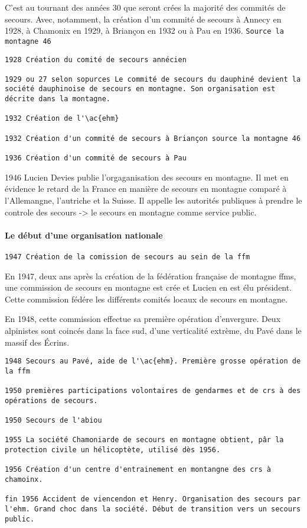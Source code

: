 C'est au tournant des années 30 que seront crées la majorité des
commités de secours. Avec, notamment, la création d'un commité de
secours à Annecy en 1928, à Chamonix en 1929, à Briançon en 1932 ou à
Pau en 1936. \texttt{Source la montagne 46}

\begin{verbatim}
1928 Création du comité de secours annécien

1929 ou 27 selon sopurces Le commité de secours du dauphiné devient la
société dauphinoise de secours en montagne. Son organisation est
décrite dans la montagne.

1932 Création de l'\ac{ehm}

1932 Création d'un commité de secours à Briançon source la montagne 46

1936 Création d'un commité de secours à Pau
\end{verbatim}


1946 Lucien Devies publie l'orgaganisation des secours en montagne. Il
met en évidence le retard de la France en manière de secours en
montagne comparé à l'Allemangne, l'autriche et la Suisse. Il appelle
les autorités publiques à prendre le controle des secours -> le
secours en montagne comme service public.

\paragraph{Le début d'une organisation nationale}

\begin{verbatim}
1947 Création de la comission de secours au sein de la ffm
\end{verbatim}


En 1947, deux ans après la création de la fédération française de
montagne \acp{ffm}, une commission de secours en montagne est crée et
Lucien  en est élu président. Cette commission fédére les
différents comités locaux de secours en montagne.

En 1948, cette commission effectue sa première opération
d'envergure. Deux alpinistes sont coincés dans la face sud, d'une
verticalité extrème, du Pavé dans le massif des Écrins. 

\begin{verbatim}
1948 Secours au Pavé, aide de l'\ac{ehm}. Première grosse opération de la ffm

1950 premières participations volontaires de gendarmes et de crs à des
opérations de secours.

1950 Secours de l'abiou

1955 La société Chamoniarde de secours en montagne obtient, pâr la
protection civile un hélicoptète, utilisé dès 1956.

1956 Création d'un centre d'entrainement en montangne des crs à
chamoinx.

fin 1956 Accident de viencendon et Henry. Organisation des secours par
l'ehm. Grand choc dans la société. Début de transition vers un secours
public.
\end{verbatim}

